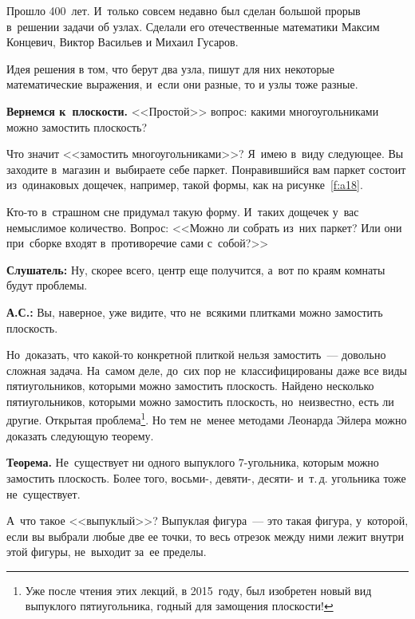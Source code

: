 Прошло 400~лет. И~только совсем недавно был сделан большой прорыв в~решении задачи об узлах.
Сделали его отечественные математики Максим Концевич, Виктор Васильев и Михаил Гусаров.

Идея решения в том, что берут два узла, пишут для них некоторые математические выражения, и~если они разные, то и узлы тоже разные.

\textbf{Вернемся к~плоскости.} <<Простой>> вопрос: какими многоугольниками можно замостить плоскость?

Что значит <<замостить многоугольниками>>? Я~имею в~виду следующее. Вы заходите в~магазин
и~выбираете себе паркет. Понравившийся вам паркет состоит из~одинаковых дощечек, например, такой
формы, как на рисунке~\ref{f:a18}.


Кто-то в~страшном сне придумал такую форму. И~таких дощечек у~вас немыслимое количество. Вопрос:
<<Можно ли собрать из~них паркет? Или они при~сборке входят в~противоречие сами с~собой?>>

\textbf{Слушатель:} Ну, скорее всего, центр еще получится, а~вот по краям комнаты будут проблемы.

\textbf{А.С.:} Вы, наверное, уже видите, что не~всякими плитками можно замостить плоскость.

Но~доказать, что какой-то конкретной плиткой нельзя замостить~--- довольно сложная задача. На~самом
деле, до~сих пор не~классифицированы даже все виды пятиугольников, которыми можно замостить
плоскость. Найдено несколько пятиугольников, которыми можно замостить плоскость, но~неизвестно,
есть ли другие. Открытая проблема\footnote{Уже после чтения этих лекций, в 2015~году,
был изобретен новый вид выпуклого пятиугольника, годный для замощения плоскости!}.
 Но тем не~менее методами Леонарда Эйлера можно доказать
следующую теорему.

\smallskip

\textbf{Теорема.} Не~существует ни одного выпуклого 7-угольника, которым можно замостить плоскость.
Более того, восьми-, девяти-, десяти- и~т.\,д. угольника тоже не~существует.

\smallskip

А~что такое <<выпуклый>>? Выпуклая фигура~--- это такая фигура, у~которой, если вы выбрали любые две
ее точки, то весь отрезок между ними лежит внутри этой фигуры, не~выходит за~ее пределы.


